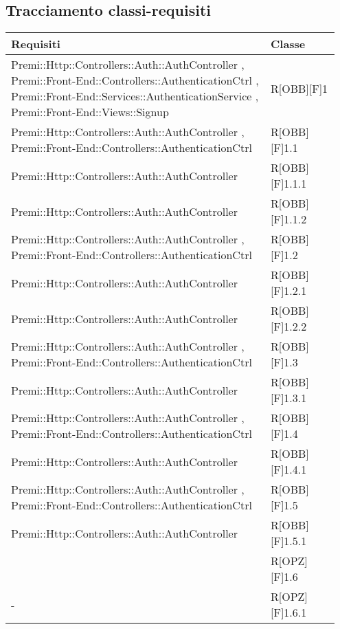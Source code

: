 \begin{table}[h]
	\subsection{Tracciamento classi-requisiti}
	\begin{center}
		\begin{tabular}{|p{0.75\linewidth}|p{0.2\linewidth}|}
			\toprule
			\textbf{Requisiti} & \textbf{Classe}\\
		\midrule
			 Premi::Http::Controllers::Auth::AuthController , Premi::Front-End::Controllers::AuthenticationCtrl , Premi::Front-End::Services::AuthenticationService , Premi::Front-End::Views::Signup & R[OBB][F]1 \\
		\midrule
			 Premi::Http::Controllers::Auth::AuthController , Premi::Front-End::Controllers::AuthenticationCtrl & R[OBB][F]1.1 \\
		\midrule
			Premi::Http::Controllers::Auth::AuthController & R[OBB][F]1.1.1 \\
		\midrule
			Premi::Http::Controllers::Auth::AuthController & R[OBB][F]1.1.2 \\
		\midrule
            Premi::Http::Controllers::Auth::AuthController , Premi::Front-End::Controllers::AuthenticationCtrl & R[OBB][F]1.2 \\
		\midrule
			Premi::Http::Controllers::Auth::AuthController & R[OBB][F]1.2.1 \\
		\midrule
		  Premi::Http::Controllers::Auth::AuthController & R[OBB][F]1.2.2 \\
		\midrule
		  Premi::Http::Controllers::Auth::AuthController , Premi::Front-End::Controllers::AuthenticationCtrl & R[OBB][F]1.3 \\
		\midrule
			Premi::Http::Controllers::Auth::AuthController & R[OBB][F]1.3.1 \\
		\midrule
			Premi::Http::Controllers::Auth::AuthController , Premi::Front-End::Controllers::AuthenticationCtrl & R[OBB][F]1.4 \\
		\midrule
			Premi::Http::Controllers::Auth::AuthController & R[OBB][F]1.4.1 \\
		\midrule
			Premi::Http::Controllers::Auth::AuthController , Premi::Front-End::Controllers::AuthenticationCtrl & R[OBB][F]1.5 \\
		\midrule
			Premi::Http::Controllers::Auth::AuthController & R[OBB][F]1.5.1 \\
		\midrule
			 & R[OPZ][F]1.6 \\
		\midrule
			- & R[OPZ][F]1.6.1 \\

\end{tabular}
\end{center}
\end{table}
